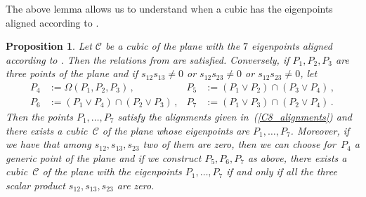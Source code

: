 \documentclass{amsart}
\theoremstyle{plain}
\newtheorem{prop}[lemma]{Proposition}
\theoremstyle{definition}
\begin{document}
%
The above lemma allows us to understand when a cubic has the eigenpoints
aligned according to .
%
\begin{prop}
Let $\mathcal{C}$ be a cubic of the plane with the $7$ eigenpoints
aligned according to .
Then the relations from  are satisfied.
Conversely, if $P_1, P_2, P_3$ are three points of the plane
and if $s_{12}s_{13} \not = 0$ or $s_{12}s_{23} \not = 0$ or
$s_{12}s_{23} \not = 0$, let
%
\begin{align*}
  P_4 &:= \Omega(P_1, P_2, P_3) \,, & P_5 &:= (P_1 \vee P_2) \cap (P_3 \vee P_4) \,, \\
  P_6 &:= (P_1 \vee P_4) \cap (P_2 \vee P_3) \,,  & P_7 &:= (P_1 \vee P_3) \cap (P_2 \vee P_4) \,.
\end{align*}
%
Then the points $P_1, \dots, P_7$ satisfy the alignments given
in~(\ref{C8_alignments}) and there exists a cubic~$\mathcal{C}$
of the plane whose eigenpoints are $P_1, \dotsc, P_7$. Moreover, if
we have that among $s_{12}, s_{13}, s_{23}$ two of them are zero,
then we can choose for~$P_4$ a generic point of the plane and if we construct
$P_5, P_6, P_7$ as above, there exists a cubic~$\mathcal{C}$ of the
plane with the eigenpoints $P_1, \dotsc, P_7$ if and only if
all the three scalar product $s_{12}, s_{13}, s_{23}$ are zero.
\end{prop}
%
\end{document}
